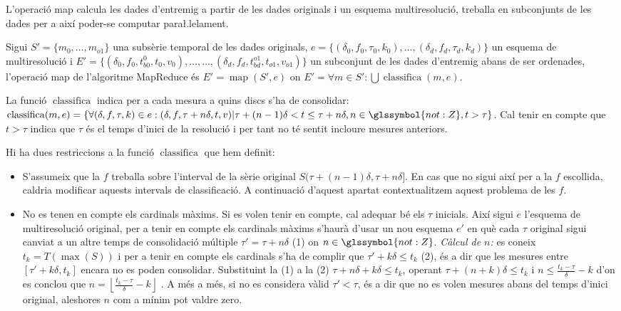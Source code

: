 L'operació map calcula les dades d'entremig a partir de les dades
originals i un esquema multiresolució, treballa en subconjunts de les
dades per a així poder-se computar para\l.lelament.
\begin{definition}
  Sigui $S'=\{m_0,\dotsc,m_{o1}\}$ una subsèrie temporal de les dades
  originals, $e=\{ (\delta_0,f_0,\tau_0,k_0),\ldots,
  (\delta_d,f_d,\tau_d,k_d)\}$ un esquema de multiresolució i
  $E'=\{(\delta_0,f_0, t_{b0}^0, t_0,v_0),\dotsc, \dotsc,
  (\delta_d,f_d, t_{bd}^{o1}, t_{o1},v_{o1}) \}$ un subconjunt de les
  dades d'entremig abans de ser ordenades, l'operació map de
  l'algoritme MapReduce és $E'=\operatorname{map}(S',e)$ on $E'=
  \forall m \in S': \bigcup\operatorname{classifica}(m,e)$.

  La funció $\operatorname{classifica}$ indica per a cada mesura a quins
  discs s'ha de consolidar: $\operatorname{classifica}(m,e)=\{ \forall
  (\delta,f,\tau,k) \in e: (\delta,f,\tau+n\delta,t,v) |
  \tau+(n-1)\delta < t \leq \tau+n\delta, n\in\glssymbol{not:Z}, t >
  \tau \}$. Cal tenir en compte que $t > \tau$ indica que $\tau$ és el temps
  d'inici de la resolució i per tant no té sentit incloure mesures
  anteriors.
\end{definition}






Hi ha dues restriccions a la funció $\operatorname{classifica}$ que
hem definit: 
\begin{itemize}

\item S'assumeix que la $f$ treballa sobre l'interval de la sèrie
  original $S(\tau+(n-1)\delta ,\tau+n\delta]$. En cas que no sigui
  així per a la $f$ escollida, caldria modificar aquests intervals de
  classificació. A continuació d'aquest apartat contextualitzem aquest
  problema de les $f$.

\item No es tenen en compte els cardinals màxims. Si es volen tenir en
  compte, cal adequar bé els $\tau$ inicials. Així sigui $e$ l'esquema
  de multiresolució original, per a tenir en compte els cardinals
  màxims s'haurà d'usar un nou esquema $e'$ en què cada $\tau$
  original sigui canviat a un altre temps de consolidació múltiple
  $\tau'= \tau+n\delta$ (1) on $n\in\glssymbol{not:Z}$.  \emph{Càlcul
    de $n$:} es coneix $t_k=T(\max(S))$ i per a tenir en compte els
  cardinals s'ha de complir que $\tau'+k\delta \leq t_k$ (2), és a dir
  que les mesures entre $[\tau'+k\delta,t_k]$ encara no es poden
  consolidar.  Substituint la (1) a la (2) $\tau+n\delta+k\delta \leq
  t_k$, operant $\tau+(n+k)\delta \leq t_k$ i $n \leq
  \frac{t_k-\tau}{\delta}-k$ d'on es conclou que $n = \left\lfloor
    \frac{t_k-\tau}{\delta}-k \right\rfloor$ .  A més a més, si no es
  considera vàlid $\tau'<\tau$, és a dir que no es volen mesures abans
  del temps d'inici original, aleshores $n$ com a mínim pot valdre
  zero.

\end{itemize}



